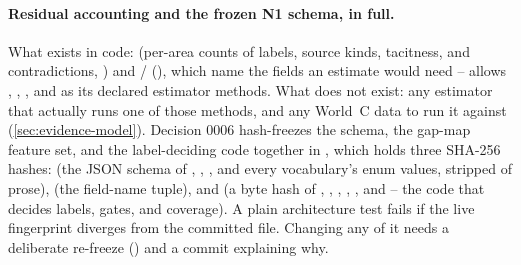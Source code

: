 \paragraph{Residual accounting and the frozen N1 schema, in full.} What exists in code:
 (per-area counts of labels, source kinds, tacitness, and contradictions,
) and /
(), which name the fields an estimate would need --
 allows , , , and
 as its declared estimator methods. What does not exist: any estimator that
actually runs one of those methods, and any World~C data to run it against
(\cref{sec:evidence-model}). Decision 0006 hash-freezes the schema, the gap-map feature set, and
the label-deciding code together in , which holds three SHA-256
hashes:  (the JSON schema of , ,
, and every vocabulary's enum values, stripped of prose), 
(the  field-name tuple), and  (a byte hash of
, , , , , and
 -- the code that decides labels, gates, and coverage). A plain 
architecture test fails if the live fingerprint diverges from the committed file. Changing any of
it needs a deliberate re-freeze () and a commit explaining
why.

